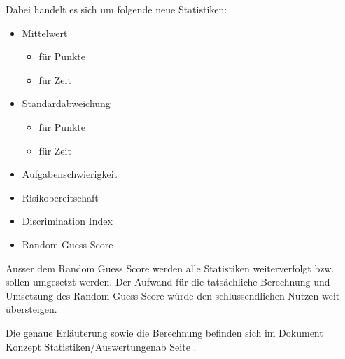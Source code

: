\noindent Dabei handelt es sich um folgende neue Statistiken:
\begin{itemize}
	\item Mittelwert
	\begin{itemize}
		\item für Punkte
		\item für Zeit
	\end{itemize}
	\item Standardabweichung
	\begin{itemize}
		\item für Punkte
		\item für Zeit
	\end{itemize}
	\item Aufgabenschwierigkeit
	\item Risikobereitschaft
	\item Discrimination Index
	\item Random Guess Score
\end{itemize}

\noindent Ausser dem Random Guess Score werden alle Statistiken weiterverfolgt bzw. sollen umgesetzt werden. Der Aufwand für die tatsächliche Berechnung und Umsetzung des Random Guess Score würde den schlussendlichen Nutzen weit übersteigen.

\bigskip

Die genaue Erläuterung sowie die Berechnung befinden sich im Dokument \glqq Konzept Statistiken/Auswertungen\grqq ab Seite \hyperlink{page.\getpagerefnumber{pdf:konzeptStatistiken}}{}.